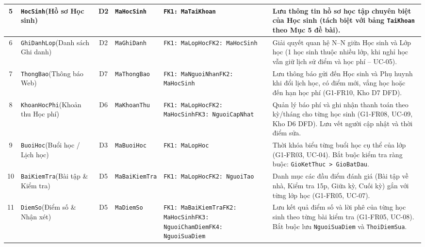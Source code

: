 {\begin{longtable}{@{}c >{\raggedright\arraybackslash}p{2.2cm} c >{\raggedright\arraybackslash}p{1.9cm} >{\raggedright\arraybackslash}p{2.6cm} >{\raggedright\arraybackslash}p{4.8cm}@{}}
\midrule
5 & \texttt{HocSinh}\newline (Hồ sơ Học sinh) & D2 & \texttt{MaHocSinh} & \texttt{FK1: MaTaiKhoan} & Lưu thông tin hồ sơ học tập chuyên biệt của Học sinh (tách biệt với bảng \texttt{TaiKhoan} theo Mục 5 đề bài). \\
\midrule
6 & \texttt{GhiDanhLop}\newline (Danh sách Ghi danh) & D2 & \texttt{MaGhiDanh} & \texttt{FK1: MaLopHoc}\newline \texttt{FK2: MaHocSinh} & Giải quyết quan hệ N--N giữa Học sinh và Lớp học (1 học sinh thuộc nhiều lớp, khi nghỉ học vẫn giữ lịch sử điểm và học phí -- UC-05). \\
\midrule
7 & \texttt{ThongBao}\newline (Thông báo Web) & D7 & \texttt{MaThongBao} & \texttt{FK1: MaNguoiNhan}\newline \texttt{FK2: MaHocSinh} & Lưu thông báo gửi đến Học sinh và Phụ huynh khi đổi lịch học, có điểm mới, vắng học hoặc đến hạn học phí (G1-FR10, Kho D7 DFD). \\
\midrule
8 & \texttt{KhoanHocPhi}\newline (Khoản thu Học phí) & D6 & \texttt{MaKhoanThu} & \texttt{FK1: MaLopHoc}\newline \texttt{FK2: MaHocSinh}\newline \texttt{FK3: NguoiCapNhat} & Quản lý báo phí và ghi nhận thanh toán theo kỳ/tháng cho từng học sinh (G1-FR08, UC-09, Kho D6 DFD). Lưu vết người cập nhật và thời điểm sửa. \\
\midrule
9 & \texttt{BuoiHoc}\newline (Buổi học / Lịch học) & D3 & \texttt{MaBuoiHoc} & \texttt{FK1: MaLopHoc} & Thời khóa biểu từng buổi học cụ thể của lớp (G1-FR03, UC-04). Bắt buộc kiểm tra ràng buộc: \texttt{GioKetThuc > GioBatDau}. \\
\midrule
10 & \texttt{BaiKiemTra}\newline (Bài tập \& Kiểm tra) & D5 & \texttt{MaBaiKiemTra} & \texttt{FK1: MaLopHoc}\newline \texttt{FK2: NguoiTao} & Danh mục các đầu điểm đánh giá (Bài tập về nhà, Kiểm tra 15p, Giữa kỳ, Cuối kỳ) gắn với từng lớp học (G1-FR05, UC-07). \\
\midrule
11 & \texttt{DiemSo}\newline (Điểm số \& Nhận xét) & D5 & \texttt{MaDiemSo} & \texttt{FK1: MaBaiKiemTra}\newline \texttt{FK2: MaHocSinh}\newline \texttt{FK3: NguoiChamDiem}\newline \texttt{FK4: NguoiSuaDiem} & Lưu kết quả điểm số và lời phê của từng học sinh theo từng bài kiểm tra (G1-FR05, UC-08). Bắt buộc lưu \texttt{NguoiSuaDiem} và \texttt{ThoiDiemSua}. \\

\end{longtable}}
